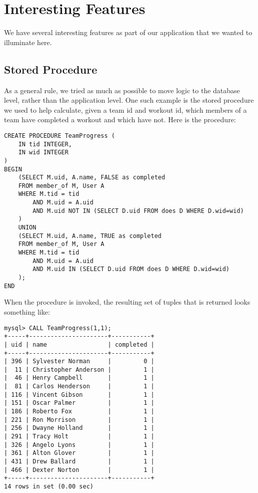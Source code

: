 \documentclass{article}
\begin{document}
\section*{Interesting Features}

We have several interesting features as part of our application that we wanted to illuminate here.

\subsection*{Stored Procedure}
As a general rule, we tried as much as possible to move logic to the database level, rather than
the application level. One such example is the stored procedure we used to help calculate,
given a team id and workout id, which members of a team have completed a workout and which
have not. Here is the procedure:

\begin{verbatim}
CREATE PROCEDURE TeamProgress (
    IN tid INTEGER,
    IN wid INTEGER
)
BEGIN
    (SELECT M.uid, A.name, FALSE as completed
    FROM member_of M, User A
    WHERE M.tid = tid 
        AND M.uid = A.uid
        AND M.uid NOT IN (SELECT D.uid FROM does D WHERE D.wid=wid)
    )
    UNION
    (SELECT M.uid, A.name, TRUE as completed
    FROM member_of M, User A
    WHERE M.tid = tid 
        AND M.uid = A.uid
        AND M.uid IN (SELECT D.uid FROM does D WHERE D.wid=wid)
    );
END
\end{verbatim}

When the procedure is invoked, the resulting set of tuples that is returned 
looks something like:

\begin{verbatim}
mysql> CALL TeamProgress(1,1);
+-----+----------------------+-----------+
| uid | name                 | completed |
+-----+----------------------+-----------+
| 396 | Sylvester Norman     |         0 |
|  11 | Christopher Anderson |         1 |
|  46 | Henry Campbell       |         1 |
|  81 | Carlos Henderson     |         1 |
| 116 | Vincent Gibson       |         1 |
| 151 | Oscar Palmer         |         1 |
| 186 | Roberto Fox          |         1 |
| 221 | Ron Morrison         |         1 |
| 256 | Dwayne Holland       |         1 |
| 291 | Tracy Holt           |         1 |
| 326 | Angelo Lyons         |         1 |
| 361 | Alton Glover         |         1 |
| 431 | Drew Ballard         |         1 |
| 466 | Dexter Norton        |         1 |
+-----+----------------------+-----------+
14 rows in set (0.00 sec)
\end{verbatim}
\end{document}
